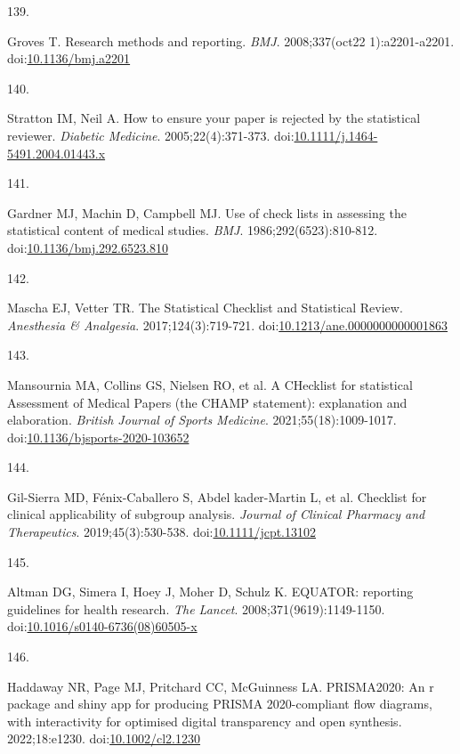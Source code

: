 \documentclass[
]{book}
\newlength{\cslhangindent}
\newlength{\csllabelwidth}
\newlength{\cslentryspacingunit} %
\newenvironment{CSLReferences}[2] %
 {%
  \setlength{\parindent}{0pt}
  \ifodd #1
  \let\oldpar\par
  \def\par{\hangindent=\cslhangindent\oldpar}
  \fi
  \setlength{\parskip}{#2\cslentryspacingunit}
 }%
 {}
\newcommand{\CSLLeftMargin}[1]{\parbox[t]{\csllabelwidth}{#1}}
\newcommand{\CSLRightInline}[1]{\parbox[t]{\linewidth - \csllabelwidth}{#1}\break}
\begin{document}
\begin{CSLReferences}{0}{0}
\leavevmode{}%
\CSLLeftMargin{139. }%
\CSLRightInline{Groves T. Research methods and reporting. \emph{BMJ}. 2008;337(oct22 1):a2201-a2201. doi:\href{https://doi.org/10.1136/bmj.a2201}{10.1136/bmj.a2201}}

\leavevmode{}%
\CSLLeftMargin{140. }%
\CSLRightInline{Stratton IM, Neil A. How to ensure your paper is rejected by the statistical reviewer. \emph{Diabetic Medicine}. 2005;22(4):371-373. doi:\href{https://doi.org/10.1111/j.1464-5491.2004.01443.x}{10.1111/j.1464-5491.2004.01443.x}}

\leavevmode{}%
\CSLLeftMargin{141. }%
\CSLRightInline{Gardner MJ, Machin D, Campbell MJ. Use of check lists in assessing the statistical content of medical studies. \emph{BMJ}. 1986;292(6523):810-812. doi:\href{https://doi.org/10.1136/bmj.292.6523.810}{10.1136/bmj.292.6523.810}}

\leavevmode{}%
\CSLLeftMargin{142. }%
\CSLRightInline{Mascha EJ, Vetter TR. The Statistical Checklist and Statistical Review. \emph{Anesthesia \& Analgesia}. 2017;124(3):719-721. doi:\href{https://doi.org/10.1213/ane.0000000000001863}{10.1213/ane.0000000000001863}}

\leavevmode{}%
\CSLLeftMargin{143. }%
\CSLRightInline{Mansournia MA, Collins GS, Nielsen RO, et al. A CHecklist for statistical Assessment of Medical Papers (the CHAMP statement): explanation and elaboration. \emph{British Journal of Sports Medicine}. 2021;55(18):1009-1017. doi:\href{https://doi.org/10.1136/bjsports-2020-103652}{10.1136/bjsports-2020-103652}}

\leavevmode{}%
\CSLLeftMargin{144. }%
\CSLRightInline{Gil-Sierra MD, Fénix-Caballero S, Abdel kader-Martin L, et al. Checklist for clinical applicability of subgroup analysis. \emph{Journal of Clinical Pharmacy and Therapeutics}. 2019;45(3):530-538. doi:\href{https://doi.org/10.1111/jcpt.13102}{10.1111/jcpt.13102}}

\leavevmode{}%
\CSLLeftMargin{145. }%
\CSLRightInline{Altman DG, Simera I, Hoey J, Moher D, Schulz K. EQUATOR: reporting guidelines for health research. \emph{The Lancet}. 2008;371(9619):1149-1150. doi:\href{https://doi.org/10.1016/s0140-6736(08)60505-x}{10.1016/s0140-6736(08)60505-x}}

\leavevmode{}%
\CSLLeftMargin{146. }%
\CSLRightInline{Haddaway NR, Page MJ, Pritchard CC, McGuinness LA. PRISMA2020: An r package and shiny app for producing PRISMA 2020-compliant flow diagrams, with interactivity for optimised digital transparency and open synthesis. 2022;18:e1230. doi:\href{https://doi.org/10.1002/cl2.1230}{10.1002/cl2.1230}}


\end{CSLReferences}
\end{document}
